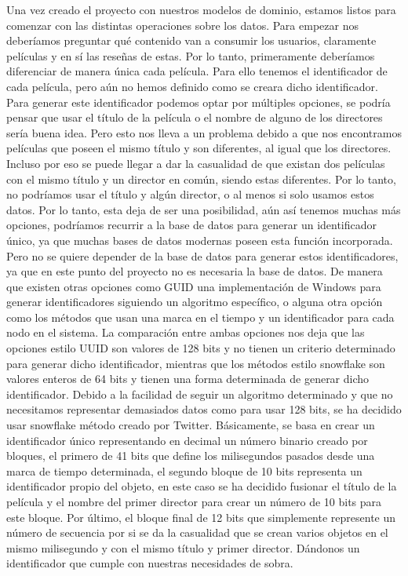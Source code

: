 Una vez creado el proyecto con nuestros modelos de dominio, estamos listos para comenzar con las 
distintas operaciones sobre los datos. Para empezar nos deberíamos preguntar qué contenido van a 
consumir los usuarios, claramente películas y en sí las reseñas de estas. Por lo tanto, primeramente 
deberíamos diferenciar de manera única cada película. Para ello tenemos el identificador de cada 
película, pero aún no hemos definido como se creara dicho identificador. Para generar este 
identificador podemos optar por múltiples opciones, se podría pensar que usar el título de la película 
o el nombre de alguno de los directores sería buena idea. Pero esto nos lleva a un problema debido a 
que nos encontramos películas que poseen el mismo título y son diferentes, al igual que los directores. 
Incluso por eso se puede llegar a dar la casualidad de que existan dos películas con el mismo título y 
un director en común, siendo estas diferentes. Por lo tanto, no podríamos usar el título y algún 
director, o al menos si solo usamos estos datos. Por lo tanto, esta deja de ser una posibilidad, aún 
así tenemos muchas más opciones, podríamos recurrir a la base de datos para generar un identificador 
único, ya que muchas bases de datos modernas poseen esta función incorporada. Pero no se quiere 
depender de la base de datos para generar estos identificadores, ya que en este punto del proyecto no 
es necesaria la base de datos. De manera que existen otras opciones como GUID una implementación de 
Windows para generar identificadores siguiendo un algoritmo específico, o alguna otra opción como los 
métodos que usan una marca en el tiempo y un identificador para cada nodo en el sistema. La comparación 
entre ambas opciones \cite{compSnowUUID} nos deja que las opciones estilo UUID son valores de 128 bits 
y no tienen un criterio determinado para generar dicho identificador, mientras que los métodos estilo 
snowflake son valores enteros de 64 bits y tienen una forma determinada de generar dicho identificador. 
Debido a la facilidad de seguir un algoritmo determinado y que no necesitamos representar demasiados 
datos como para usar 128 bits, se ha decidido usar snowflake \cite{snowF} método creado por Twitter. 
Básicamente, se basa en crear un identificador único representando en decimal un número binario creado 
por bloques, el primero de 41 bits que define los milisegundos pasados desde una marca de tiempo 
determinada, el segundo bloque de 10 bits representa un identificador propio del objeto, en este caso 
se ha decidido fusionar el título de la película y el nombre del primer director para crear un número 
de 10 bits para este bloque. Por último, el bloque final de 12 bits que simplemente represente un 
número de secuencia por si se da la casualidad que se crean varios objetos en el mismo milisegundo y 
con el mismo título y primer director. Dándonos un identificador que cumple con nuestras necesidades de 
sobra.

